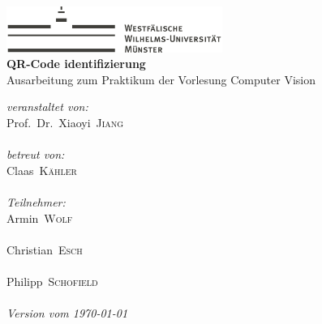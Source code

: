 
\begin{titlepage}
\begin{center}
\includegraphics[height=1.5cm, keepaspectratio]{images/Logo_WWU_Muenster.pdf} \\[1.0cm]
{\huge\sffamily\bfseries QR-Code identifizierung}\\[0.5cm]
{\large Ausarbeitung zum Praktikum der Vorlesung  Computer Vision}\\[3.0cm]
\end{center}

\begin{minipage}[b]{0.5\textwidth}
	{\large \textit{veranstaltet von:}}\\[5pt]
	{\Large Prof.\ Dr.\ Xiaoyi\ \textsc{Jiang}}\\[4pt]
	{}\\[.5cm] 

	{\large \textit{betreut von:}}\\[5pt]
	{\Large Claas\ \textsc{Kähler}}\\[4pt]
	{}\\[0.5cm] 

	{\large \textit{Teilnehmer:}}\\[5pt]
	{\Large Armin\ \textsc{Wolf}}\\[4pt]
    {}\\[5pt] 
	{\Large Christian\ \textsc{Esch}}\\[4pt]
	{}\\[5pt] 
	{\Large Philipp\ \textsc{Schofield}}\\[4pt]
	{}\\[.5cm] 

	{\large\itshape Version vom \today}\\
\end{minipage}

\end{titlepage}

